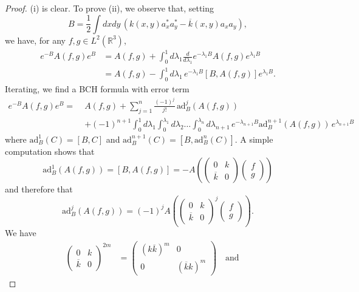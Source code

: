\documentclass[11pt,a4paper]{article}
\newcommand{\bR}{{\mathbb R}}
\begin{document}
\begin{proof}
(i) is clear. To prove (ii), we observe that, setting 
\[  B = \frac{1}{2} \int dx dy \, \left(k(x,y) a_x^* a_y^* - \overline{k} (x,y) a_x a_y \right) , \]
we have, for any $f,g \in L^2 (\bR^3)$,  
\[ \begin{split} e^{-B} A (f,g) e^{B} & = A (f,g) + \int_0^1 d \lambda_1  \frac{d}{d\lambda_1} e^{-\lambda_1 B} A (f,g) e^{\lambda_1 B}\\
& = A (f,g) - \int_0^1 d \lambda_1  \, e^{-\lambda_1 B} [B,A (f,g)]
e^{\lambda_1 B}.
 \end{split} \]
Iterating, we find a BCH formula with error term
\begin{equation}\label{eq:baker} \begin{split} e^{-B} A (f,g) e^{B} = \; &A (f,g) + \sum_{j=1}^n \frac{(-1)^j}{j!} \,\text{ad}_B^j (A (f,g)) \\ &+(-1)^{n+1}  \int_0^1 d\lambda_1 \int_0^{\lambda_1} d\lambda_2 \dots \int_0^{\lambda_{n}} d\lambda_{n+1} \, e^{-\lambda_{n+1} B}  \text{ad}_B^{n+1} (A (f,g)) \, e^{\lambda_{n+1} B}  \end{split}\end{equation}
where $\text{ad}_B^1 (C) = [B,C]$ and $\text{ad}_B^{n+1}(C) = [B,\text{ad}_B^n(C)]$. A simple computation shows that 
\[  \text{ad}_B^1 (A (f,g)) = [ B, A(f,g)] = - A \left(\left(  \begin{array}{ll}0 &  k  \\ \overline{k} & 0 \end{array} \right) \left( \begin{array}{l} f \\ g \end{array} \right) \right)  \]
and therefore that 
\[ \text{ad}^j_B (A (f,g)) = (-1)^j A  \left(\left(  \begin{array}{ll}0 &  k  \\ \overline{k} & 0 \end{array} \right)^j \left( \begin{array}{l} f \\ g \end{array} \right) \right). \]
We have 
\[ \begin{split} \left(  \begin{array}{ll}0 &  k  \\ \overline{k} & 0 \end{array} \right)^{2m} &= \left(  \begin{array}{ll} (k \overline{k})^m &  0 \\  0  & (\overline{k} k)^m  \end{array} \right)  \quad \text{and } \quad

\end{split}\]
\end{proof}
\end{document}
